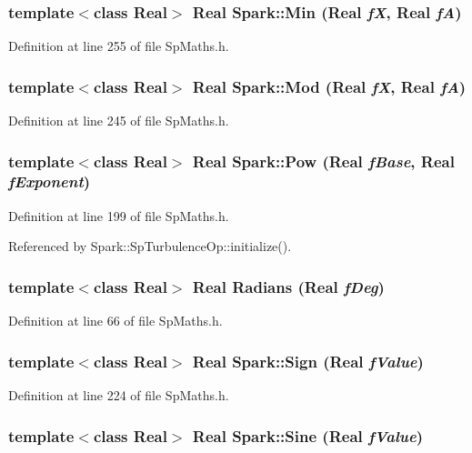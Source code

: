 \subsubsection{\setlength{\rightskip}{0pt plus 5cm}template$<$class Real$>$ Real Spark::Min (Real {\em f\-X}, Real {\em f\-A})}\label{namespaceSpark_a55}


Definition at line 255 of file Sp\-Maths.h.
\subsubsection{\setlength{\rightskip}{0pt plus 5cm}template$<$class Real$>$ Real Spark::Mod (Real {\em f\-X}, Real {\em f\-A})}\label{namespaceSpark_a57}


Definition at line 245 of file Sp\-Maths.h.
\subsubsection{\setlength{\rightskip}{0pt plus 5cm}template$<$class Real$>$ Real Spark::Pow (Real {\em f\-Base}, Real {\em f\-Exponent})}\label{namespaceSpark_a47}


Definition at line 199 of file Sp\-Maths.h.

Referenced by Spark::Sp\-Turbulence\-Op::initialize().
\subsubsection{\setlength{\rightskip}{0pt plus 5cm}template$<$class Real$>$ Real Radians (Real {\em f\-Deg})}\label{namespaceSpark_a38}


Definition at line 66 of file Sp\-Maths.h.
\subsubsection{\setlength{\rightskip}{0pt plus 5cm}template$<$class Real$>$ Real Spark::Sign (Real {\em f\-Value})}\label{namespaceSpark_a52}


Definition at line 224 of file Sp\-Maths.h.
\subsubsection{\setlength{\rightskip}{0pt plus 5cm}template$<$class Real$>$ Real Spark::Sine (Real {\em f\-Value})}\label{namespaceSpark_a66}


